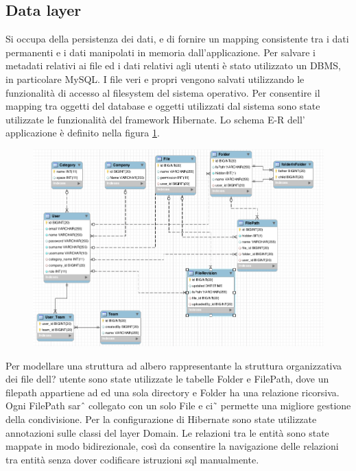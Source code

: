 \subsection{Data layer}

Si occupa della persistenza dei dati, e di fornire un mapping
consistente tra i dati permanenti e i dati manipolati in memoria
dall'applicazione. Per salvare i metadati relativi ai file ed i dati
relativi agli utenti è stato utilizzato un DBMS, in particolare
MySQL. I file veri e propri vengono salvati utilizzando le
funzionalità di accesso al filesystem del sistema operativo. Per
consentire il mapping tra oggetti del database e oggetti utilizzati
dal sistema sono state utilizzate le funzionalità del framework
Hibernate.
Lo schema E-R dell' applicazione è definito nella
figura \ref{ER}. 

\begin{figure}
  \includegraphics[scale=0.4]{er}
  \caption{}
  \label{ER}
\end{figure}

Per modellare una struttura ad albero rappresentante la struttura
organizzativa dei file dell? utente sono state utilizzate le tabelle
Folder e FilePath, dove un filepath appartiene ad ed una sola
directory e Folder ha una relazione ricorsiva. Ogni FilePath sarˆ
collegato con un solo File e ci˜ permette una migliore gestione della
condivisione. Per la configurazione di Hibernate sono state utilizzate
annotazioni sulle classi del layer Domain.  Le relazioni tra le entità
sono state mappate in modo bidirezionale, così da consentire la
navigazione delle relazioni tra entità senza dover codificare
istruzioni sql manualmente. 

